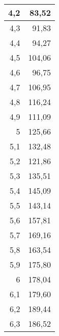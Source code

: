 \documentclass{article}
\begin{document}
\begin{center}
\begin{longtable}{|r|r|}
4,2                                & 83,52                              \\ \hline
4,3                                & 91,83                              \\ \hline
4,4                                & 94,27                              \\ \hline
4,5                                & 104,06                             \\ \hline
4,6                                & 96,75                              \\ \hline
4,7                                & 106,95                             \\ \hline
4,8                                & 116,24                             \\ \hline
4,9                                & 111,09                             \\ \hline
5                                  & 125,66                             \\ \hline
5,1                                & 132,48                             \\ \hline
5,2                                & 121,86                             \\ \hline
5,3                                & 135,51                             \\ \hline
5,4                                & 145,09                             \\ \hline
5,5                                & 143,14                             \\ \hline
5,6                                & 157,81                             \\ \hline
5,7                                & 169,16                             \\ \hline
5,8                                & 163,54                             \\ \hline
5,9                                & 175,80                              \\ \hline
6                                  & 178,04                             \\ \hline
6,1                                & 179,60                              \\ \hline
6,2                                & 189,44                             \\ \hline
6,3                                & 186,52                             \\ \hline

\end{longtable}
\end{center}
\end{document}
